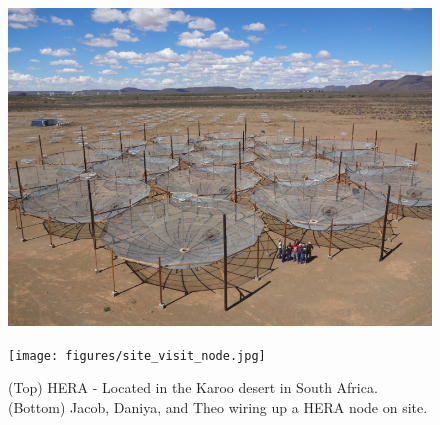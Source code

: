\documentclass[a0,landscape]{a0poster}
\begin{document}
\begin{multicols}{4}

\begin{figure}[H]
\centering
\vspace*{20pt}
\label{fig:HERA}
\includegraphics[width=0.65\linewidth]{figures/HERA19.png}
\end{figure}
\begin{figure}[H]
\centering
\texttt{[image: figures/site\_visit\_node.jpg]}
\caption{(Top) HERA - Located in the Karoo desert in South Africa.  (Bottom) Jacob, Daniya, and Theo wiring up a HERA node on site.}
\end{figure}



\end{multicols}
\end{document}

